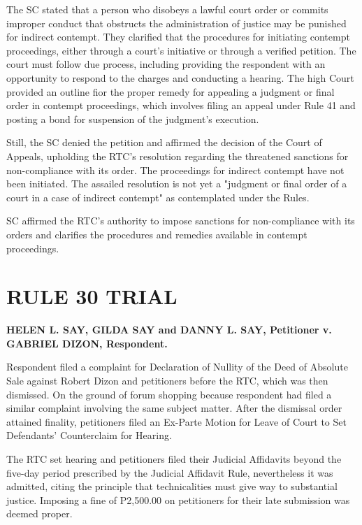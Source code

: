 \documentclass[
12pt,
oneside,
onehalfspacing,
headsepline
]{DigestCollection}
\begin{document}
The SC stated that a person who disobeys a lawful court order or commits improper conduct that obstructs the administration of justice may be punished for indirect contempt. They clarified that the procedures for initiating contempt proceedings, either through a court's initiative or through a verified petition. The court must follow due process, including providing the respondent with an opportunity to respond to the charges and conducting a hearing. The high Court provided an outline fior the proper remedy for appealing a judgment or final order in contempt proceedings, which involves filing an appeal under Rule 41 and posting a bond for suspension of the judgment's execution.

Still, the SC denied the petition and affirmed the decision of the Court of Appeals, upholding the RTC's resolution regarding the threatened sanctions for non-compliance with its order. The proceedings for indirect contempt have not been initiated. The assailed resolution is not yet a "judgment or final order of a court in a case of indirect contempt" as contemplated under the Rules. 

SC affirmed the RTC's authority to impose sanctions for non-compliance with its orders and clarifies the procedures and remedies available in contempt proceedings.

\chapter{RULE 30 TRIAL}
\label{759e4680-0a16-11ef-932c-63c852f65e48}


\label{77a828d0-0a2d-11ef-a1a5-03b0bde1fccf}


\noindent\textbf{HELEN L. SAY, GILDA SAY and DANNY L. SAY, Petitioner v. \\GABRIEL DIZON, Respondent. }\vspace{0.4cm}

Respondent filed a complaint for Declaration of Nullity of the Deed of Absolute Sale against Robert Dizon and petitioners before the RTC, which was then dismissed. On the ground of forum shopping because respondent had filed a similar complaint involving the same subject matter. After the dismissal order attained finality, petitioners filed an Ex-Parte Motion for Leave of Court to Set Defendants' Counterclaim for Hearing.

The RTC set hearing and petitioners filed their Judicial Affidavits beyond the five-day period prescribed by the Judicial Affidavit Rule, nevertheless it was admitted, citing the principle that technicalities must give way to substantial justice. Imposing a fine of P2,500.00 on petitioners for their late submission was deemed proper.
\end{document}
